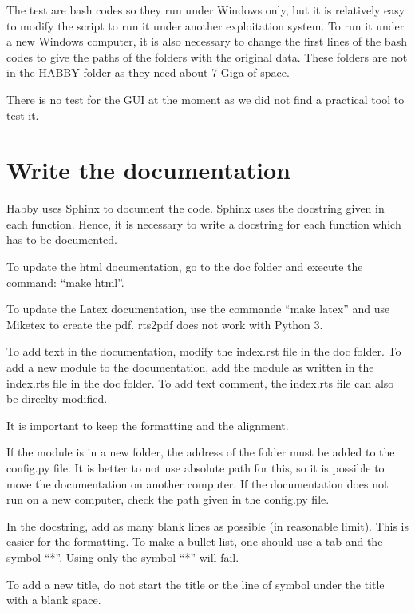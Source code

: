 \documentclass[letterpaper,10pt,english]{sphinxmanual}
\begin{document}
The test are bash codes so they run under Windows only, but it is relatively easy to modify the script to run it under another exploitation system. To run it under a new Windows computer, it is also necessary to change the first lines of the bash codes to give the paths of the folders with the original data. These folders are not in the HABBY folder as they need about 7 Giga of space.

There is no test for the GUI at the moment as we did not find a practical tool to test it.


\section{Write the documentation}
\label{\detokenize{index:write-the-documentation}}
Habby uses Sphinx to document the code. Sphinx uses the docstring given in each function. Hence, it is necessary to write a docstring for each function which has to be documented.

To update the html documentation, go to the doc folder and execute the command: “make html”.

To update the Latex documentation, use the commande ``make latex'' and use Miketex to create the pdf. rts2pdf does not work with Python 3.

To add text in the documentation, modify the index.rst file in the doc folder. To add a new module to the
documentation, add the module as written in the index.rts file in the doc folder. To add text comment, the index.rts file can also be direclty modified.

It is important to keep the formatting and the alignment.

If the module is in a new folder, the address of the folder must be added to the config.py file.
It is better to not use absolute path for this, so it is possible to move the documentation on another
computer. If the documentation does not run on a new computer, check the path given in the config.py file.

In the docstring, add as many blank lines as possible (in reasonable limit). This is easier for the
formatting. To make a bullet list, one should use a tab and the symbol ``*''.  Using only the symbol ``*'' will
fail.

To add a new title, do not start the title or the line of symbol under the title with a blank space.
\end{document}
